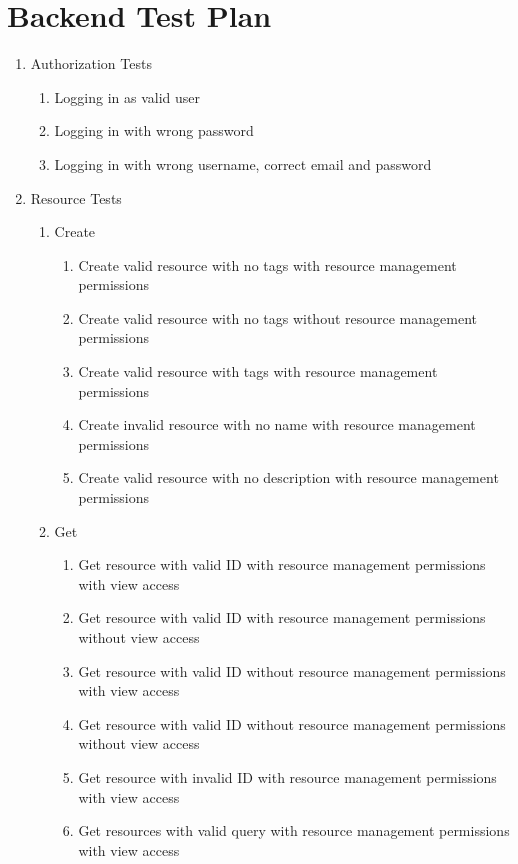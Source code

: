 \documentclass[12pt]{article}
\begin{document}
\clearpage
\appendix
\section{Backend Test Plan}
\label{appendix:backendtest}
\begin{enumerate}
    \item Authorization Tests
    \begin{enumerate}
        \item Logging in as valid user
        \item Logging in with wrong password
        \item Logging in with wrong username, correct email and password
    \end{enumerate}
    \item Resource Tests
    \begin{enumerate}
        \item Create
        \begin{enumerate}
            \item Create valid resource with no tags with resource management permissions
            \item Create valid resource with no tags without resource management permissions
            \item Create valid resource with tags with resource management permissions
            \item Create invalid resource with no name with resource management permissions
            \item Create valid resource with no description with resource management permissions
        \end{enumerate}
        \item Get
        \begin{enumerate}
            \item Get resource with valid ID with resource management permissions with view access
            \item Get resource with valid ID with resource management permissions without view access
            \item Get resource with valid ID without resource management permissions with view access
            \item Get resource with valid ID without resource management permissions without view access
            \item Get resource with invalid ID with resource management permissions with view access
            \item Get resources with valid query with resource management permissions with view access

\end{enumerate}
\end{enumerate}
\end{enumerate}
\end{document}
